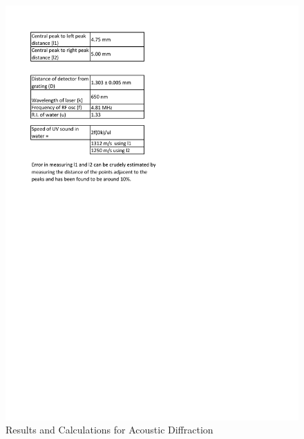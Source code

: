 	\begin{figure}[bth]
		\begin{center}
			\includegraphics[width=1.3\linewidth]{gfx/e2_results}
		\end{center}
		\caption[Calculations and Results]{Results and Calculations for Acoustic Diffraction}
	\label{e2_result}
	\end{figure}

